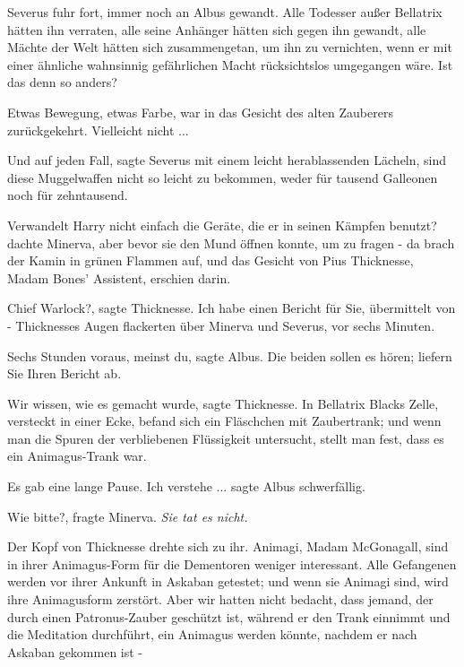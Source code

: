 Severus fuhr fort, immer noch an Albus gewandt. \glqq{}Alle Todesser außer
Bellatrix hätten ihn verraten, alle seine Anhänger hätten sich gegen ihn
gewandt, alle Mächte der Welt hätten sich zusammengetan, um ihn zu vernichten,
wenn er mit einer ähnliche wahnsinnig gefährlichen Macht rücksichtslos
umgegangen wäre. Ist das denn so anders?\grqq{}

Etwas Bewegung, etwas Farbe, war in das Gesicht des alten Zauberers
zurückgekehrt. \glqq{}Vielleicht nicht ...\grqq{}

\glqq{}Und auf jeden Fall\grqq{}, sagte Severus mit einem leicht herablassenden
Lächeln, \glqq{}sind diese Muggelwaffen nicht so leicht zu bekommen, weder für
tausend Galleonen noch für zehntausend.\grqq{}

Verwandelt Harry nicht einfach die Geräte, die er in seinen Kämpfen benutzt?
dachte Minerva, aber bevor sie den Mund öffnen konnte, um zu fragen - da brach
der Kamin in grünen Flammen auf, und das Gesicht von Pius Thicknesse, Madam
Bones' Assistent, erschien darin.

\glqq{}Chief Warlock?\grqq{}, sagte Thicknesse. \glqq{}Ich habe einen Bericht für
Sie, übermittelt von -\grqq{} Thicknesses Augen flackerten über Minerva und
Severus, \glqq{}vor sechs Minuten\grqq{}.

\glqq{}Sechs Stunden voraus, meinst du\grqq{}, sagte Albus. \glqq{}Die beiden
sollen es hören; liefern Sie Ihren Bericht ab.\grqq{}

\glqq{}Wir wissen, wie es gemacht wurde\grqq{}, sagte Thicknesse. \glqq{}In
Bellatrix Blacks Zelle, versteckt in einer Ecke, befand sich ein Fläschchen mit
Zaubertrank; und wenn man die Spuren der verbliebenen Flüssigkeit untersucht,
stellt man fest, dass es ein Animagus-Trank war.\grqq{}

Es gab eine lange Pause. \glqq{}Ich verstehe ...\grqq{} sagte Albus schwerfällig.

\glqq{}Wie bitte?\grqq{}, fragte Minerva. \emph{Sie tat es nicht.}

Der Kopf von Thicknesse drehte sich zu ihr. \glqq{}Animagi, Madam McGonagall,
sind in ihrer Animagus-Form für die Dementoren weniger interessant. Alle
Gefangenen werden vor ihrer Ankunft in Askaban getestet; und wenn sie Animagi
sind, wird ihre Animagusform zerstört. Aber wir hatten nicht bedacht, dass
jemand, der durch einen Patronus-Zauber geschützt ist, während er den Trank
einnimmt und die Meditation durchführt, ein Animagus werden könnte, nachdem er
nach Askaban gekommen ist -\grqq{}

